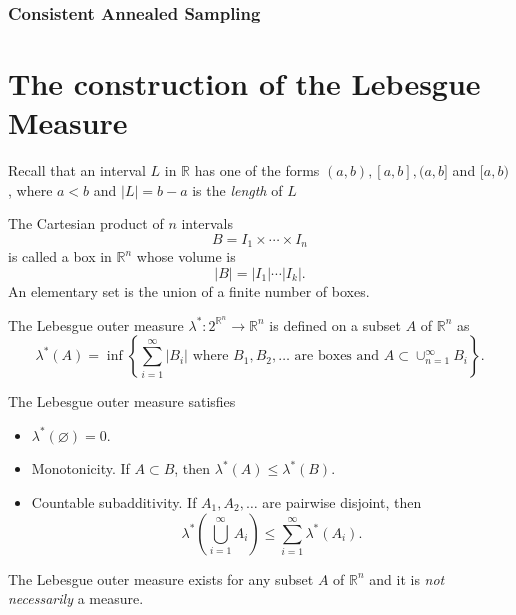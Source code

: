 \subsubsection{Consistent Annealed Sampling}


\section{The construction of the Lebesgue Measure}
Recall that an interval $L$ in $\mathbb{R}$ has one of the forms $(a,b),[a,b],(a,b]$ and $[a,b)$, where $a<b$ and $|L|=b-a$ is the \textit{length} of $L$
\label{appendix:lebmeasure}
\begin{definition}
    The Cartesian product of $n$ intervals
    $$B=I_1\times\cdots\times I_n$$
    is called a box in $\mathbb{R}^n$ whose volume is
    $$|B|=|I_1|\cdots|I_k|.$$
    An elementary set is the union of a finite number of boxes.
\end{definition}

\begin{definition}
    The Lebesgue outer measure $\lambda^*:2^{\mathbb{R}^n}\to\mathbb{R}^n$ is defined on a subset $A$ of $\mathbb{R}^n$ as
    \begin{equation}
        \lambda^*(A)=\inf\left\{\sum\limits_{i=1}^\infty |B_i| \text{ where } B_1,B_2,\ldots \text{ are boxes and } A\subset\cup_{n=1}^\infty B_i\right\}.
    \end{equation}
\end{definition}

\begin{proposition}
    The Lebesgue outer measure satisfies
    \begin{itemize}
        \item $\lambda^*(\varnothing) = 0$.
        \item Monotonicity. If $A\subset B$, then $\lambda^*(A)\le\lambda^*(B)$.
        \item Countable subadditivity. If $A_1,A_2,\ldots$ are pairwise disjoint, then
              $$\lambda^*\left(\bigcup\limits_{i=1}^\infty A_i\right)\le\sum\limits_{i=1}^\infty\lambda^*(A_i).$$
    \end{itemize}
\end{proposition}

\begin{remark}
    The Lebesgue outer measure exists for any subset $A$ of $\mathbb{R}^n$ and it is \textit{not necessarily} a measure.
\end{remark}

